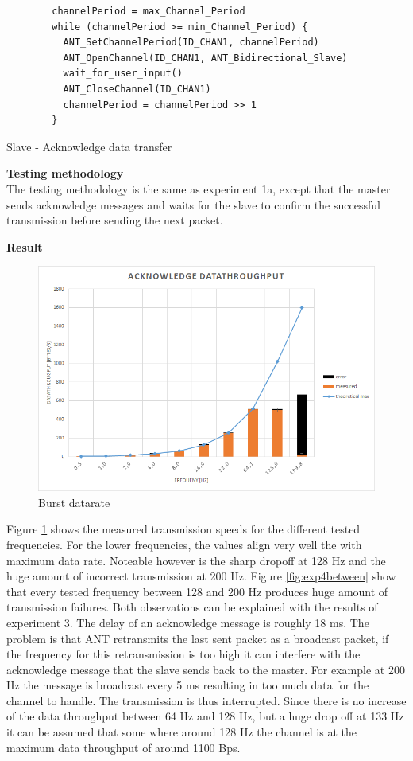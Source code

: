\begin{description}
	\begin{code}
		\begin{verbatim}
		channelPeriod = max_Channel_Period
		while (channelPeriod >= min_Channel_Period) {
		  ANT_SetChannelPeriod(ID_CHAN1, channelPeriod)
		  ANT_OpenChannel(ID_CHAN1, ANT_Bidirectional_Slave)
		  wait_for_user_input()
		  ANT_CloseChannel(ID_CHAN1)
		  channelPeriod = channelPeriod >> 1
		}
		\end{verbatim}
		\caption{Slave - Acknowledge data transfer}\label{lst:sExp4}
	\end{code}
	\item{\textbf{Testing methodology}} \hfill \\ The testing methodology is the same as experiment 1a, except that the master sends acknowledge messages and waits for the slave to confirm the successful transmission before sending the next packet. 
	\item{\textbf{Result}} \hfill \\
	\begin{figure}[h]
		\centering
		\includegraphics[scale=0.5]{./pics/exp4_norm.png}
		\caption{Burst datarate}\label{fig:exp4norm}
	\end{figure}
	Figure \ref{fig:exp4norm} shows the measured transmission speeds for the different tested frequencies. For the lower frequencies, the values align very well the with maximum data rate. Noteable however is the sharp dropoff at 128 Hz and the huge amount of incorrect transmission at 200 Hz. Figure \ref{fig:exp4between} show that every tested frequency between 128 and 200 Hz produces huge amount of transmission failures. Both observations can be explained with the results of experiment 3. The delay of an acknowledge message is roughly 18 ms. The problem is that ANT retransmits the last sent packet as a broadcast packet, if the frequency for this retransmission is too high it can interfere with the acknowledge message that the slave sends back to the master. For example at 200 Hz the message is broadcast every 5 ms resulting in too much data for the channel to handle. The transmission is thus interrupted. Since there is no increase of the data throughput between 64 Hz and 128 Hz, but a huge drop off at 133 Hz it can be assumed that some where around 128 Hz the channel is at the maximum data throughput of around 1100 Bps.

\end{description}
